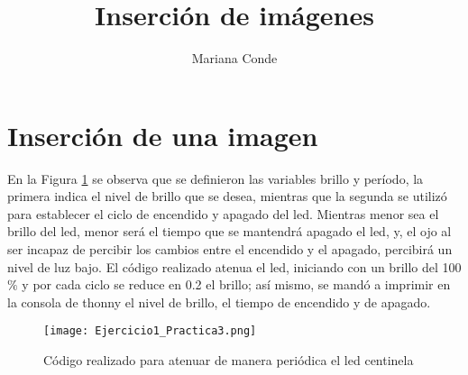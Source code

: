\documentclass{article}
\title{Inserción de imágenes}
\author{Mariana Conde}
\date{}
\begin{document}
\maketitle
\section{Inserción de una imagen}

En la Figura \ref{fig:Ejercicio1_Practica3} se observa que se definieron las variables brillo y período, la primera indica el nivel de brillo que se desea, mientras que la segunda se utilizó para establecer el ciclo de encendido y apagado del led. Mientras menor sea el brillo del led, menor será el tiempo que se mantendrá apagado el led, y, el ojo al ser incapaz de percibir los cambios entre el encendido y el apagado, percibirá un nivel de luz bajo. El código realizado atenua el led, iniciando con un brillo del 100$\%$ y por cada ciclo se reduce en 0.2 el brillo; así mismo, se mandó a imprimir en la consola de thonny el nivel de brillo, el tiempo de encendido y de apagado. 
\begin{figure}[h]
    \centering  %
    \texttt{[image: Ejercicio1\_Practica3.png]}
    \caption{\label{fig:Ejercicio1_Practica3}Código realizado para atenuar de manera periódica el led centinela}    %
\end{figure}
\end{document}
